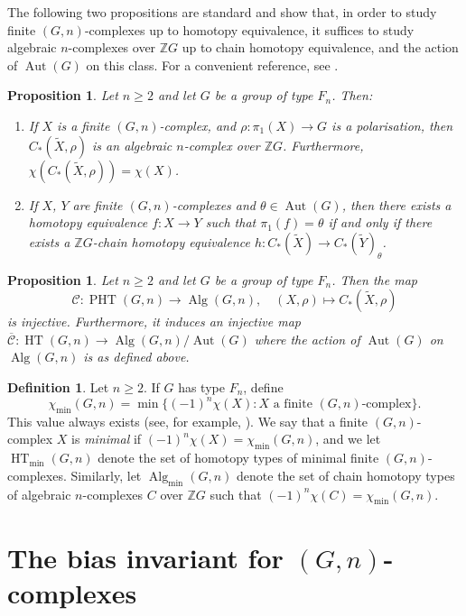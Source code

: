 \documentclass[11pt,a4paper,leqno]{amsart}
\newtheorem{proposition}[theorem]{Proposition}
\theoremstyle{definition}
\newtheorem{definition}[theorem]{Definition}
\theoremstyle{remark}
\newenvironment{clist}[1]
{\begin{enumerate}[\normalfont #1]}
{\end{enumerate}}
\newcommand{\wt}{\widetilde}
\newcommand{\Z}{\mathbb{Z}}
\newcommand{\ol}{\overline}
\DeclareMathOperator{\Aut}{Aut}
\DeclareMathOperator{\Alg}{Alg}
\DeclareMathOperator{\HT}{HT}
\DeclareMathOperator{\PHT}{PHT}
\begin{document}
The following two propositions are standard and show that, in order to study finite $(G,n)$-complexes up to homotopy equivalence, it suffices to study algebraic $n$-complexes over $\Z G$ up to chain homotopy equivalence, and the action of $\Aut(G)$ on this class. For a convenient reference, see \cite[Proposition 5.1 \& Lemma 6.2]{Ni20-I}.

\begin{proposition} \label{prop:he-vs-che}
Let $n \ge 2$ and let $G$ be a group of type $F_n$. Then:
\begin{clist}{(i)}
\item
If $X$ is a finite $(G,n)$-complex, and $\rho\colon  \pi_1(X) \to G$ is a polarisation, then $C_*(\wt X,\rho)$ is an algebraic $n$-complex over $\Z G$. Furthermore, $\chi(C_*(\wt X,\rho)) = \chi(X)$.
\item
If $X$, $Y$ are finite $(G,n)$-complexes and $\theta \in \Aut(G)$, then there exists a homotopy equivalence $f\colon X \to Y$ such that $\pi_1(f) = \theta$ if and only if there exists a $\Z G$-chain homotopy equivalence $h\colon C_*(\wt X) \to C_*(\wt Y)_\theta$.	
\end{clist}
\end{proposition}

\begin{proposition} \label{prop:d2-problem}
Let $n \ge 2$ and let $G$ be a group of type $F_n$. Then the map
\[ \mathscr{C}\colon  \PHT(G,n) \to \Alg(G,n), \quad (X,\rho) \mapsto C_*(\wt X,\rho)  \]
is injective. Furthermore, it induces an injective map $\ol{\mathscr{C}}\colon  \HT(G,n) \to \Alg(G,n)/\Aut(G)$ where the action of $\Aut(G)$ on $\Alg(G,n)$ is as defined above. 
\end{proposition}

\begin{definition} \label{def:minimal-Gn}
	Let $n \ge 2$. If $G$ has type $F_n$, define
\[\chi_{\min}(G,n) = \min\{(-1)^n \chi(X)\colon \text{$X$ a finite $(G,n)$-complex} \}.\]
This value always exists (see, for example, \cite[Proposition 2.3 (ii)]{Ni23}).
We say that a finite $(G,n)$-complex $X$ is \textit{minimal} if $(-1)^n \chi(X) = \chi_{\min}(G,n)$, and we let $\HT_{\min}(G,n)$ denote the set of homotopy types of minimal finite $(G,n)$-complexes. Similarly, let $\Alg_{\min}(G,n)$ denote the set of chain homotopy types of algebraic $n$-complexes $C$ over $\Z G$ such that $(-1)^n\chi(C) = \chi_{\min}(G,n)$.
\end{definition}

\section{The bias invariant for $(G,n)$-complexes} \label{s:bias-complexes}
\end{document}
